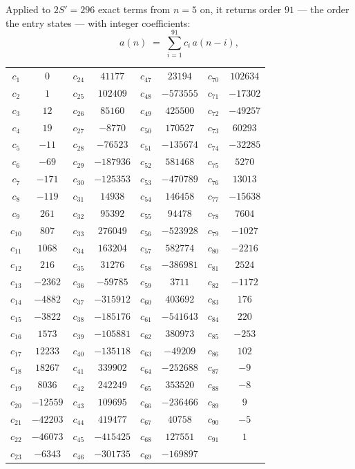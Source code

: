 \documentclass[11pt,a4paper]{article}
\theoremstyle{plain}
\theoremstyle{definition}
\begin{document}
Applied to $2S'=296$ exact terms from $n=5$ on, it returns order $91$ --- the
order the entry states --- with integer coefficients:
\[
a(n)\;=\;\sum_{i=1}^{91}c_i\,a(n-i),
\]
\begin{center}\small
\begin{tabular}{cccccccc}
$c_{1}$ & $0$ & $c_{24}$ & $41177$ & $c_{47}$ & $23194$ & $c_{70}$ & $102634$ \\
$c_{2}$ & $1$ & $c_{25}$ & $102409$ & $c_{48}$ & $-573555$ & $c_{71}$ & $-17302$ \\
$c_{3}$ & $12$ & $c_{26}$ & $85160$ & $c_{49}$ & $425500$ & $c_{72}$ & $-49257$ \\
$c_{4}$ & $19$ & $c_{27}$ & $-8770$ & $c_{50}$ & $170527$ & $c_{73}$ & $60293$ \\
$c_{5}$ & $-11$ & $c_{28}$ & $-76523$ & $c_{51}$ & $-135674$ & $c_{74}$ & $-32285$ \\
$c_{6}$ & $-69$ & $c_{29}$ & $-187936$ & $c_{52}$ & $581468$ & $c_{75}$ & $5270$ \\
$c_{7}$ & $-171$ & $c_{30}$ & $-125353$ & $c_{53}$ & $-470789$ & $c_{76}$ & $13013$ \\
$c_{8}$ & $-119$ & $c_{31}$ & $14938$ & $c_{54}$ & $146458$ & $c_{77}$ & $-15638$ \\
$c_{9}$ & $261$ & $c_{32}$ & $95392$ & $c_{55}$ & $94478$ & $c_{78}$ & $7604$ \\
$c_{10}$ & $807$ & $c_{33}$ & $276049$ & $c_{56}$ & $-523928$ & $c_{79}$ & $-1027$ \\
$c_{11}$ & $1068$ & $c_{34}$ & $163204$ & $c_{57}$ & $582774$ & $c_{80}$ & $-2216$ \\
$c_{12}$ & $216$ & $c_{35}$ & $31276$ & $c_{58}$ & $-386981$ & $c_{81}$ & $2524$ \\
$c_{13}$ & $-2362$ & $c_{36}$ & $-59785$ & $c_{59}$ & $3711$ & $c_{82}$ & $-1172$ \\
$c_{14}$ & $-4882$ & $c_{37}$ & $-315912$ & $c_{60}$ & $403692$ & $c_{83}$ & $176$ \\
$c_{15}$ & $-3822$ & $c_{38}$ & $-185176$ & $c_{61}$ & $-541643$ & $c_{84}$ & $220$ \\
$c_{16}$ & $1573$ & $c_{39}$ & $-105881$ & $c_{62}$ & $380973$ & $c_{85}$ & $-253$ \\
$c_{17}$ & $12233$ & $c_{40}$ & $-135118$ & $c_{63}$ & $-49209$ & $c_{86}$ & $102$ \\
$c_{18}$ & $18267$ & $c_{41}$ & $339902$ & $c_{64}$ & $-252688$ & $c_{87}$ & $-9$ \\
$c_{19}$ & $8036$ & $c_{42}$ & $242249$ & $c_{65}$ & $353520$ & $c_{88}$ & $-8$ \\
$c_{20}$ & $-12559$ & $c_{43}$ & $109695$ & $c_{66}$ & $-236466$ & $c_{89}$ & $9$ \\
$c_{21}$ & $-42203$ & $c_{44}$ & $419477$ & $c_{67}$ & $40758$ & $c_{90}$ & $-5$ \\
$c_{22}$ & $-46073$ & $c_{45}$ & $-415425$ & $c_{68}$ & $127551$ & $c_{91}$ & $1$ \\
$c_{23}$ & $-6343$ & $c_{46}$ & $-301735$ & $c_{69}$ & $-169897$ &  &  \\
\end{tabular}
\end{center}
\end{document}
